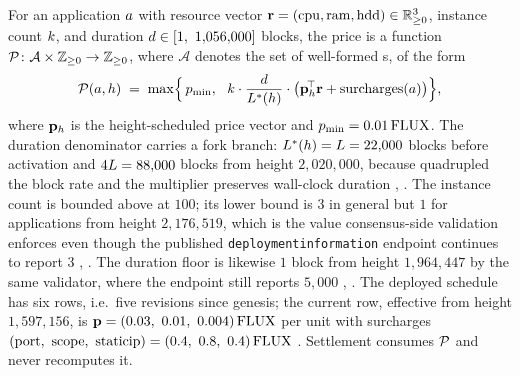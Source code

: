 \begin{definition}
\label{def:pnr:price}
For an application $a$ with resource vector
$\mathbf{r} = (\mathrm{cpu}, \mathrm{ram}, \mathrm{hdd}) \in \mathbb{R}_{\ge 0}^{3}$, instance count
$k$, and duration $d \in [1,\ 1{,}056{,}000]$ blocks, the price
is a function
$\mathcal{P}\colon \mathcal{A} \times \mathbb{Z}_{\ge 0} \to \mathbb{Z}_{\ge 0}$, where $\mathcal{A}$
denotes the set of well-formed \appspec{}s, of the form
\[
  \price(\app, \hgt) \;=\; \max\!\Big\{\,p_{\min},\ \
    \ninst \cdot \frac{\dur}{L^{\ast}(\hgt)} \cdot
    \big(\pricevec_{\hgt}^{\!\top}\resvec + \mathrm{surcharges}(\app)\big)\Big\},
\]
where $\mathbf{p}_{h}$ is the height-scheduled price vector and $p_{\min} = 0.01\,\mathrm{FLUX}$. The
duration denominator carries a fork branch: $L^{\ast}(h) = L = 22{,}000$ blocks before
\PoN activation and $4L = 88{,}000$ blocks from height $2{,}020{,}000$, because \PoN
quadrupled the block rate and the multiplier preserves wall-clock duration \shipped
{}, .
The instance count is bounded above at $100$; its lower bound is $3$ in general but $1$ for
\specv{8} applications from height $2{,}176{,}519$, which is the value consensus-side validation
enforces even though the published \texttt{deploymentinformation} endpoint continues to report $3$
\shipped {}, . The duration floor is likewise $1$ block from height $1{,}964{,}447$ by the same validator, where the endpoint still reports $5{,}000$ \shipped {}, . The deployed schedule has six rows, i.e.\ five revisions since genesis; the
current row, effective from height $1{,}597{,}156$, is
$\pricevec = (0.03,\ 0.01,\ 0.004)\flux$ per unit with surcharges
$(\text{port},\ \text{scope},\ \text{staticip}) = (0.4,\ 0.8,\ 0.4)\,\mathrm{FLUX}$ \shipped
{}. Settlement consumes
$\mathcal{P}$ and never recomputes it.
\end{definition}

